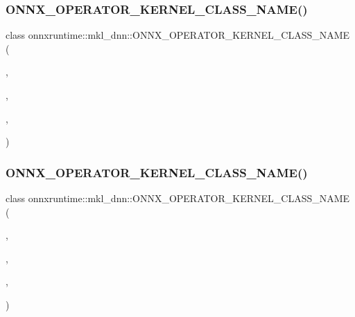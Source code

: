 \subsubsection{\texorpdfstring{O\+N\+N\+X\+\_\+\+O\+P\+E\+R\+A\+T\+O\+R\+\_\+\+K\+E\+R\+N\+E\+L\+\_\+\+C\+L\+A\+S\+S\+\_\+\+N\+A\+M\+E()}{ONNX\_OPERATOR\_KERNEL\_CLASS\_NAME()}\hspace{0.1cm}{\footnotesize\ttfamily [3/4]}}
{\footnotesize\ttfamily class onnxruntime\+::mkl\+\_\+dnn\+::\+O\+N\+N\+X\+\_\+\+O\+P\+E\+R\+A\+T\+O\+R\+\_\+\+K\+E\+R\+N\+E\+L\+\_\+\+C\+L\+A\+S\+S\+\_\+\+N\+A\+ME (\begin{DoxyParamCaption}\item[{\mbox{\hyperlink{namespaceonnxruntime_abd1901c951bcb5845eeeaff9dd75ce97}{k\+Mkl\+Dnn\+Execution\+Provider}}}]{,  }\item[{\mbox{\hyperlink{namespaceonnxruntime_ac0e7c0c106a2c9e9594560a3ab289fa0}{k\+Onnx\+Domain}}}]{,  }\item[{1}]{,  }\item[{Memcpy\+From\+Host}]{ }\end{DoxyParamCaption})}

\mbox{\label{namespaceonnxruntime_1_1mkl__dnn_a5206b86b78807d0179ddf69ba860dd45}} 
\subsubsection{\texorpdfstring{O\+N\+N\+X\+\_\+\+O\+P\+E\+R\+A\+T\+O\+R\+\_\+\+K\+E\+R\+N\+E\+L\+\_\+\+C\+L\+A\+S\+S\+\_\+\+N\+A\+M\+E()}{ONNX\_OPERATOR\_KERNEL\_CLASS\_NAME()}\hspace{0.1cm}{\footnotesize\ttfamily [4/4]}}
{\footnotesize\ttfamily class onnxruntime\+::mkl\+\_\+dnn\+::\+O\+N\+N\+X\+\_\+\+O\+P\+E\+R\+A\+T\+O\+R\+\_\+\+K\+E\+R\+N\+E\+L\+\_\+\+C\+L\+A\+S\+S\+\_\+\+N\+A\+ME (\begin{DoxyParamCaption}\item[{\mbox{\hyperlink{namespaceonnxruntime_abd1901c951bcb5845eeeaff9dd75ce97}{k\+Mkl\+Dnn\+Execution\+Provider}}}]{,  }\item[{\mbox{\hyperlink{namespaceonnxruntime_ac0e7c0c106a2c9e9594560a3ab289fa0}{k\+Onnx\+Domain}}}]{,  }\item[{1}]{,  }\item[{Memcpy\+To\+Host}]{ }\end{DoxyParamCaption})}

